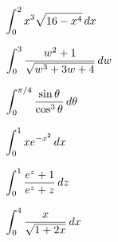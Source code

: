 \documentclass[12pt]{article}
\begin{document}
\Example $\displaystyle\int_0^2 x^3\sqrt{16-x^4}\,dx$

\vspace{60mm}

\Example $\displaystyle\int_0^3\frac{w^2+1}{\sqrt{w^3+3w+4}}\,dw$

\vspace{60mm}

\Example $\displaystyle\int_0^{\pi/4}\frac{\sin\theta}{\cos^3\theta}\,d\theta$

\newpage

\Example $\displaystyle\int_0^1 xe^{-x^2}\,dx$

\vspace{60mm}

\Example $\displaystyle\int_0^1\frac{e^z+1}{e^z+z}\,dz$

\vspace{60mm}

\Example $\displaystyle\int_0^4\frac{x}{\sqrt{1+2x}}\,dx$
\end{document}
